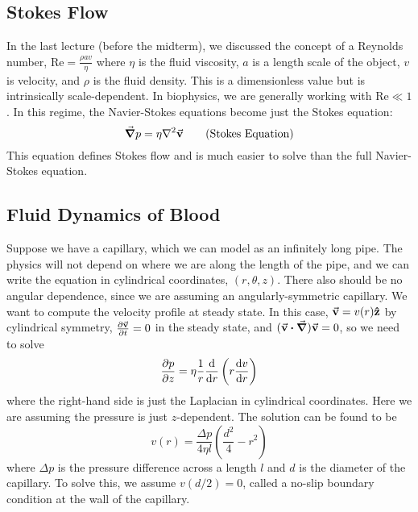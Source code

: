 \documentclass[a4paper,twoside,master.tex]{subfiles}
\begin{document}

\subsection{Stokes Flow}\label{sub:stokes_flow}

In the last lecture (before the midterm), we discussed the concept of a Reynolds number, $ \text{Re} = \frac{\rho a v}{\eta} $ where $ \eta $ is the fluid viscosity, $ a $ is a length scale of the object, $ v $ is velocity, and $ \rho $ is the fluid density. This is a dimensionless value but is intrinsically scale-dependent. In biophysics, we are generally working with $ \text{Re} \ll 1 $. In this regime, the Navier-Stokes equations become just the Stokes equation:
\begin{equation}
    \grad{p} = \eta \laplacian{\va{v}}\tag{Stokes Equation}
\end{equation}
This equation defines Stokes flow and is much easier to solve than the full Navier-Stokes equation.

\subsection{Fluid Dynamics of Blood}\label{sub:fluid_dynamics_of_blood}

Suppose we have a capillary, which we can model as an infinitely long pipe. The physics will not depend on where we are along the length of the pipe, and we can write the equation in cylindrical coordinates, $ (r, \theta, z) $. There also should be no angular dependence, since we are assuming an angularly-symmetric capillary. We want to compute the velocity profile at steady state. In this case, $ \va{v} = v(r) \vu{z} $ by cylindrical symmetry, $ \pdv{\va{v}}{t} = 0 $ in the steady state, and $ (\va{v} \vdot \grad) \va{v} = 0 $, so we need to solve
\begin{equation}
    \pdv{p}{z} = \eta \frac{1}{r} \dv{r}\left( r \dv{v}{r} \right)
\end{equation}
where the right-hand side is just the Laplacian in cylindrical coordinates. Here we are assuming the pressure is just $ z $-dependent. The solution can be found to be
\begin{equation}
    v(r) = \frac{\Delta p}{4 \eta l} \left( \frac{d^2}{4} - r^2 \right)
\end{equation}
where $ \Delta p $ is the pressure difference across a length $ l $ and $ d $ is the diameter of the capillary. To solve this, we assume $ v(d/2) = 0 $, called a no-slip boundary condition at the wall of the capillary.
\end{document}
